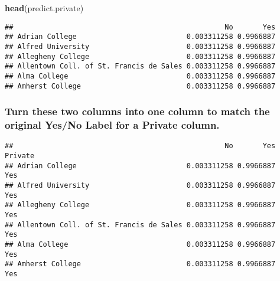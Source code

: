 \documentclass[]{article}
\newenvironment{Shaded}{\begin{snugshade}}{\end{snugshade}}
\newcommand{\CommentTok}[1]{\textcolor[rgb]{0.56,0.35,0.01}{\textit{#1}}}
\newcommand{\ControlFlowTok}[1]{\textcolor[rgb]{0.13,0.29,0.53}{\textbf{#1}}}
\newcommand{\FloatTok}[1]{\textcolor[rgb]{0.00,0.00,0.81}{#1}}
\newcommand{\KeywordTok}[1]{\textcolor[rgb]{0.13,0.29,0.53}{\textbf{#1}}}
\newcommand{\NormalTok}[1]{#1}
\newcommand{\OperatorTok}[1]{\textcolor[rgb]{0.81,0.36,0.00}{\textbf{#1}}}
\newcommand{\StringTok}[1]{\textcolor[rgb]{0.31,0.60,0.02}{#1}}
\begin{document}
\begin{Shaded}
\begin{Highlighting}[]
\KeywordTok{head}\NormalTok{(predict.private)}
\end{Highlighting}
\end{Shaded}

\begin{verbatim}
##                                                  No       Yes
## Adrian College                          0.003311258 0.9966887
## Alfred University                       0.003311258 0.9966887
## Allegheny College                       0.003311258 0.9966887
## Allentown Coll. of St. Francis de Sales 0.003311258 0.9966887
## Alma College                            0.003311258 0.9966887
## Amherst College                         0.003311258 0.9966887
\end{verbatim}

\hypertarget{turn-these-two-columns-into-one-column-to-match-the-original-yesno-label-for-a-private-column.}{%
\subsubsection{Turn these two columns into one column to match the
original Yes/No Label for a Private
column.}\label{turn-these-two-columns-into-one-column-to-match-the-original-yesno-label-for-a-private-column.}}

\begin{Shaded}
\end{Shaded}

\begin{verbatim}
##                                                  No       Yes Private
## Adrian College                          0.003311258 0.9966887     Yes
## Alfred University                       0.003311258 0.9966887     Yes
## Allegheny College                       0.003311258 0.9966887     Yes
## Allentown Coll. of St. Francis de Sales 0.003311258 0.9966887     Yes
## Alma College                            0.003311258 0.9966887     Yes
## Amherst College                         0.003311258 0.9966887     Yes
\end{verbatim}
\end{document}
